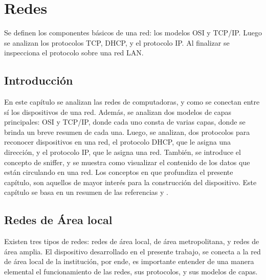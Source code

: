 \renewcommand{\chaptername}{Redes}  
\graphicspath{{parte_2/redes/}}
\chapter{Redes}
\markright{\chaptername }

\begin{center}
	\begin{tcolorbox}[colback=gray!5!white, %
		colframe=blue!75!black,
		title= \center{\Large{resumen}} ]
		Se definen los componentes básicos de una red: los modelos OSI y TCP/IP. Luego se analizan los protocolos TCP, DHCP, y el protocolo IP. Al finalizar se inspecciona el protocolo sobre una red LAN.  

	\end{tcolorbox}
\end{center}    
\section{Introducción} 
En este capítulo se analizan las redes de computadoras, y como se conectan entre sí los dispositivos de una red. Además, se analizan dos modelos de capas principales: OSI y TCP/IP, donde cada uno consta de varias capas, donde se brinda un breve resumen de cada una. 
Luego, se analizan, dos protocolos para reconocer dispositivos en una red, el protocolo DHCP, que le asigna una dirección, y el protocolo IP, que le asigna una red. También, se introduce el concepto de sniffer, y se muestra como visualizar el contenido de los datos que están circulando en una red. Los conceptos en que profundiza el presente capítulo, son aquellos de mayor interés para la construcción del dispositivo. Este capítulo se basa en un resumen de las referencias \cite{Stallings2004} y \cite{Tanenbaum2003}.  


\section{Redes de Área local }
Existen tres tipos de redes: redes de área local, de área metropolitana, y redes de área amplia. El dispositivo desarrollado en el presente trabajo, se conecta a la red de área local de la institución, por ende, es importante entender de una manera elemental el funcionamiento de las redes, sus protocolos, y sus modelos de capas.   

